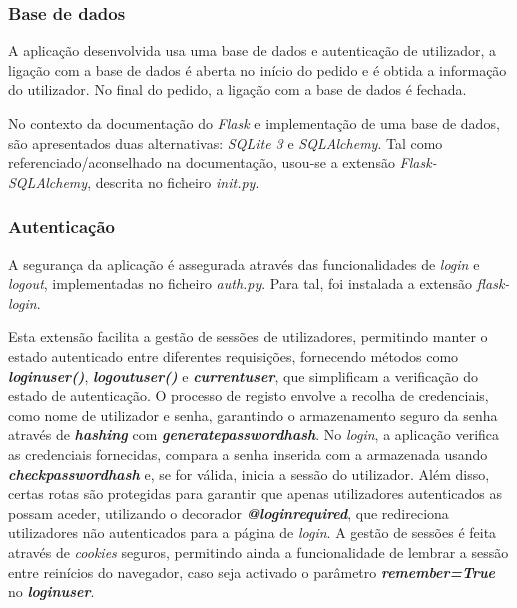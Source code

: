 \subsubsection{Base de dados}
A aplicação desenvolvida usa uma base de dados e autenticação de utilizador, a ligação com a base de dados é aberta no início do pedido e é obtida a informação do utilizador. No final do pedido, a ligação com a base de dados é fechada.

No contexto da documentação do \textit{Flask} e implementação de uma base de dados, são apresentados duas alternativas: \textit{SQLite 3} e \textit{SQLAlchemy}. Tal como referenciado/aconselhado na documentação, usou-se a extensão \textit{Flask-SQLAlchemy}, descrita no ficheiro \textit{\textunderscore\textunderscore init.py\textunderscore\textunderscore}.

\subsubsection{Autenticação}
A segurança da aplicação é assegurada através das funcionalidades de \textit{login} e \textit{logout}, implementadas no ficheiro \textit{auth.py}. Para tal, foi instalada a extensão \textit{flask-login}.

Esta extensão facilita a gestão de sessões de utilizadores, permitindo manter o estado autenticado entre diferentes requisições, fornecendo métodos como \textbf{\textit{login\textunderscore user()}}, \textbf{\textit{logout\textunderscore user()}} e \textbf{\textit{current\textunderscore user}}, que simplificam a verificação do estado de autenticação. O processo de registo envolve a recolha de credenciais, como nome de utilizador e senha, garantindo o armazenamento seguro da senha através de \textbf{\textit{hashing}} com \textbf{\textit{generate\textunderscore password\textunderscore hash}}. No \textit{login}, a aplicação verifica as credenciais fornecidas, compara a senha inserida com a armazenada usando \textbf{\textit{check\textunderscore password\textunderscore hash}} e, se for válida, inicia a sessão do utilizador. Além disso, certas rotas são protegidas para garantir que apenas utilizadores autenticados as possam aceder, utilizando o decorador \textbf{\textit{@login\textunderscore required}}, que redireciona utilizadores não autenticados para a página de \textit{login}. A gestão de sessões é feita através de \textit{cookies} seguros, permitindo ainda a funcionalidade de lembrar a sessão entre reinícios do navegador, caso seja activado o parâmetro \textbf{\textit{remember=True}} no \textbf{\textit{login\textunderscore user}}. 

